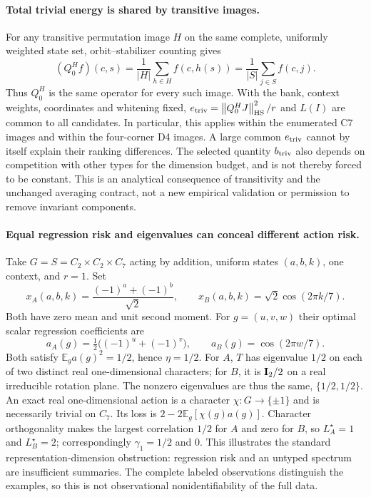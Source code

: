 \paragraph{Total trivial energy is shared by transitive images.}
For any transitive permutation image $H$ on the same complete, uniformly weighted state set, orbit--stabilizer counting gives
\begin{equation}
 (Q_0^{H}f)(c,s)
 =\frac1{|H|}\sum_{h\in H}f(c,h(s))
 =\frac1{|S|}\sum_{j\in S}f(c,j).
 \label{sp:transitive-trivial-energy}
\end{equation}
Thus $Q_0^H$ is the same operator for every such image. With the bank, context weights, coordinates and whitening fixed, $e_{\rm triv}=\left\lVert Q_0^HJ\right\rVert_{\mathrm{HS}}^2/r$ and $L(I)$ are common to all candidates. In particular, this applies within the enumerated C7 images and within the four-corner D4 images. A large common $e_{\rm triv}$ cannot by itself explain their ranking differences. The selected quantity $b_{\rm triv}$ also depends on competition with other types for the dimension budget, and is not thereby forced to be constant. This is an analytical consequence of transitivity and the unchanged averaging contract, not a new empirical validation or permission to remove invariant components.

\paragraph{Equal regression risk and eigenvalues can conceal different action risk.}
\label{sp:counterexample}
Take $G=S=C_2\times C_2\times C_7$ acting by addition, uniform states $(a,b,k)$, one context, and $r=1$. Set
\[
 x_A(a,b,k)=\frac{(-1)^a+(-1)^b}{\sqrt2},\qquad
 x_B(a,b,k)=\sqrt2\cos(2\pi k/7).
\]
Both have zero mean and unit second moment. For $g=(u,v,w)$ their optimal scalar regression coefficients are
\[
 a_A(g)=\tfrac12\big((-1)^u+(-1)^v\big),\qquad
 a_B(g)=\cos(2\pi w/7).
\]
Both satisfy $\mathbb E_g a(g)^2=1/2$, hence $\eta=1/2$. For $A$, $T$ has eigenvalue $1/2$ on each of two distinct real one-dimensional characters; for $B$, it is $\mathbf{I}_2/2$ on a real irreducible rotation plane. The nonzero eigenvalues are thus the same, $\{1/2,1/2\}$. An exact real one-dimensional action is a character $\chi:G\to\{\pm1\}$ and is necessarily trivial on $C_7$. Its loss is $2-2\mathbb E_g[\chi(g)a(g)]$. Character orthogonality makes the largest correlation $1/2$ for $A$ and zero for $B$, so $L_A^\star=1$ and $L_B^\star=2$; correspondingly $\gamma_1=1/2$ and $0$. This illustrates the standard representation-dimension obstruction: regression risk and an untyped spectrum are insufficient summaries. The complete labeled observations distinguish the examples, so this is not observational nonidentifiability of the full data.

